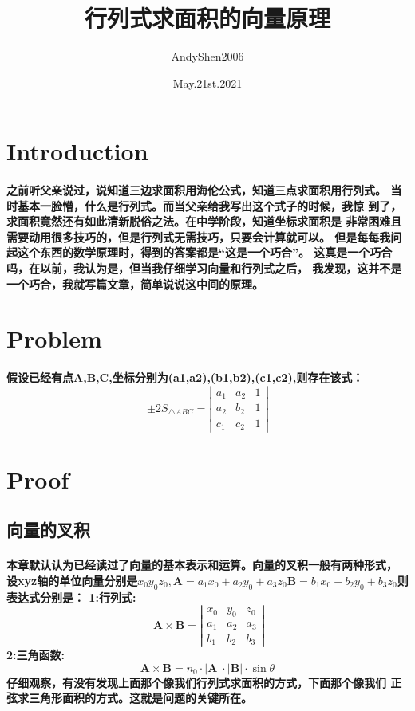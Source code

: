 \documentclass[final,11pt,oneside,UTF8]{article}
\author{AndyShen2006}
\date{May.21st.2021}
\title{行列式求面积的向量原理}
\begin{document}
\maketitle
\section{Introduction}
\paragraph{
    之前听父亲说过，说知道三边求面积用海伦公式，知道三点求面积用行列式。
    当时基本一脸懵，什么是行列式。而当父亲给我写出这个式子的时候，我惊
    到了，求面积竟然还有如此清新脱俗之法。在中学阶段，知道坐标求面积是
    非常困难且需要动用很多技巧的，但是行列式无需技巧，只要会计算就可以。
    但是每每我问起这个东西的数学原理时，得到的答案都是“这是一个巧合”。
    这真是一个巧合吗，在以前，我认为是，但当我仔细学习向量和行列式之后，
    我发现，这并不是一个巧合，我就写篇文章，简单说说这中间的原理。
}
\section{Problem}
\paragraph{
    假设已经有点A,B,C,坐标分别为(a1,a2),(b1,b2),(c1,c2),则存在该式：\\
    \[
        \pm 2S_{\triangle ABC}=
        \left|\begin{array}{cccc}
            a_1 & a_2 & 1 \\
            a_2 & b_2 & 1 \\
            c_1 & c_2 & 1
        \end{array}\right|
    \]
}
\section{Proof}
\subsection{向量的叉积}
\paragraph{
    本章默认认为已经读过了向量的基本表示和运算。向量的叉积一般有两种形式，
    设xyz轴的单位向量分别是$x_0 y_0 z_0, \textbf{A}=a_1x_0+a_2y_0+a_3z_0
        \textbf{B}=b_1x_0+b_2y_0+b_3z_0$则表达式分别是：
    1:行列式:\\
    \[
        \ \textbf{A} \times \textbf{B}=
        \left|\begin{array}{cccc}
            x_0 & y_0 & z_0 \\
            a_1 & a_2 & a_3 \\
            b_1 & b_2 & b_3
        \end{array}\right|
    \]
    2:三角函数:\\
    $$\textbf{A} \times \textbf{B} = n_0 \cdot |\textbf{A}| \cdot |\textbf{B}| \cdot \sin{\theta}$$
    仔细观察，有没有发现上面那个像我们行列式求面积的方式，下面那个像我们
    正弦求三角形面积的方式。这就是问题的关键所在。
}
\end{document}
